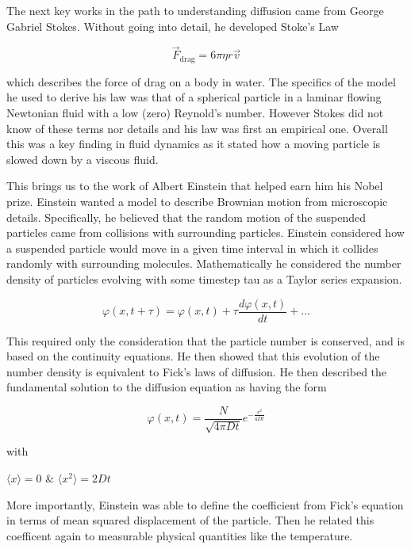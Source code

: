 \documentclass{article}
\begin{document}
The next key works in the path to understanding diffusion came from George Gabriel Stokes. Without going into detail, he developed Stoke's Law

\begin{equation}
\vec{F}_{\text{drag}} = 6\pi\eta r \vec{v}
\end{equation}

which describes the force of drag on a body in water. The specifics of the model he used to derive his law was that of a spherical particle in a laminar flowing Newtonian fluid with a low (zero) Reynold's number. However Stokes did not know of these terms nor details and his law was first an empirical one. Overall this was a key finding in fluid dynamics as it stated how a moving particle is slowed down by a viscous fluid.

This brings us to the work of Albert Einstein that helped earn him his Nobel prize. Einstein wanted a model to describe Brownian motion from microscopic details. Specifically, he believed that the random motion of the suspended particles came from collisions with surrounding particles. Einstein considered how a suspended particle would move in a given time interval in which it collides randomly with surrounding molecules. Mathematically he considered the number density of particles evolving with some timestep tau as a Taylor series expansion.

\begin{equation}
\varphi(x, t + \tau) = \varphi(x, t) + \tau \frac{d\varphi(x, t)}{dt} + \ldots
\end{equation}

This required only the consideration that the particle number is conserved, and is based on the continuity equations. He then showed that this evolution of the number density is equivalent to Fick's laws of diffusion. He then described the fundamental solution to the diffusion equation as having the form

\begin{equation}
\varphi(x, t) = \frac{N}{\sqrt{4\pi D t}} e^{-\frac{x^2}{4Dt}}
\end{equation}

with

$\langle x \rangle=0$ \& $\langle x^2 \rangle = 2Dt$

More importantly, Einstein was able to define the coefficient from Fick's equation in terms of mean squared displacement of the particle. Then he related this coefficent again to measurable physical quantities like the temperature.
\end{document}
